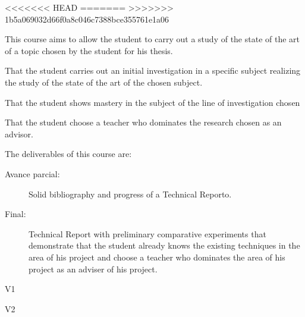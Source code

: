 \begin{syllabus}

<<<<<<< HEAD
=======
>>>>>>> 1b5a069032d66f0a8c046c7388bce355761e1a06

\begin{justification}
This course aims to allow the student to carry out a study of the state of the art of a topic chosen by the student for his thesis.
\end{justification}

\begin{goals}
\item That the student carries out an initial investigation in a specific subject realizing the study of the state of the art of the chosen subject.
\item That the student shows mastery in the subject of the line of investigation chosen
\item That the student choose a teacher who dominates the research chosen as an advisor. 
\item The deliverables of this course are:
	\begin{description}
		\item [Avance parcial:] Solid bibliography and progress of a Technical Reporto.
		\item [Final:] Technical Report with preliminary comparative experiments that demonstrate that the student already knows the existing techniques in the area of his project and choose a teacher who dominates the area of his project as an adviser of his project.
	\end{description}
\end{goals}

\begin{outcomes}{V1}
\item {}
\item {}
\item {}
\item {}
\item {}
\item {}
\item {}
\item {}
\end{outcomes}

\begin{outcomes}{V2}
\item {}
\item {}
\item {}
\item {}
\end{outcomes}


\end{syllabus}
